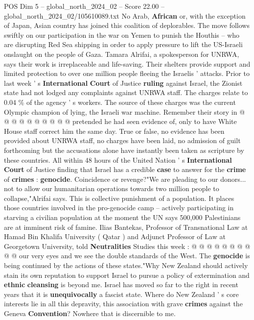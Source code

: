\begin{textsample}{POS Dim 5 – global\_north\_2024\_02 – Score 22.00 – global\_north\_2024\_02/105610089.txt}
No Arab, \textbf{African} or, with the exception of Japan, Asian country has joined this coalition of deplorables.
The move follows swiftly on our participation in the war on Yemen to punish the Houthis -- who are disrupting Red Sea shipping in order to apply pressure to lift the US-Israeli onslaught on the people of Gaza.
Tamara Alrifai, a spokesperson for UNRWA, says their work is irreplaceable and life-saving.
Their shelters provide support and limited protection to over one million people fleeing the Israelis ' attacks.
Prior to last week ' s \textbf{International} \textbf{Court} of Justice \textbf{ruling} against Israel, the Zionist state had not lodged any complaints against UNRWA staff.
The charges relate to 0.04 \% of the agency ' s workers.
The source of these charges was the current Olympic champion of lying, the Israeli war machine.
Remember their story in @ @ @ @ @ @ @ @ @ @ pretended he had seen evidence of, only to have White House staff correct him the same day.
True or false, no evidence has been provided about UNRWA staff, no charges have been laid, no admission of guilt forthcoming but the accusations alone have instantly been taken as scripture by these countries.
All within 48 hours of the United Nation ' s \textbf{International} \textbf{Court} of Justice finding that Israel has a credible \textbf{case} to answer for the \textbf{crime} of \textbf{crimes} : \textbf{genocide}.
Coincidence or revenge?"We are pleading to our donors... not to allow our humanitarian operations towards two million people to collapse,"Alrifai says.
This is collective punishment of a population.
It places those countries involved in the pro-genocide camp -- actively participating in starving a civilian population at the moment the UN says 500,000 Palestinians are at imminent risk of famine.
Ilias Bantekas, Professor of Transnational Law at Hamad Bin Khalifa University ( Qatar ) and Adjunct Professor of Law at Georgetown University, told \textbf{Neutralities} Studies this week : @ @ @ @ @ @ @ @ @ @ our very eyes and we see the double standards of the West.
The \textbf{genocide} is being continued by the actions of these states."Why New Zealand should actively stain its own reputation to support Israel to pursue a policy of extermination and \textbf{ethnic} \textbf{cleansing} is beyond me.
Israel has moved so far to the right in recent years that it is \textbf{unequivocally} a fascist state.
Where do New Zealand ' s core interests lie in all this depravity, this association with grave \textbf{crimes} against the Geneva \textbf{Convention}?
Nowhere that is discernible to me.

\end{textsample}
